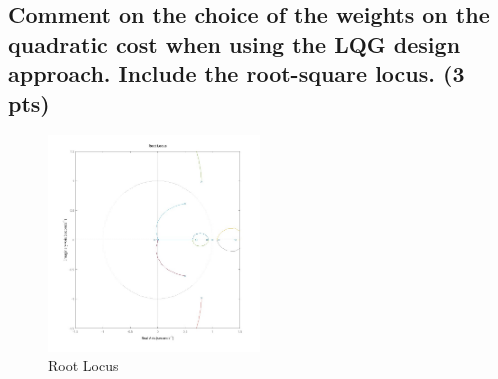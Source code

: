 \subsection{Comment on the choice of the weights on the quadratic cost when using the LQG design approach. Include the root-square locus. (3 pts)}
\vspace{10pt}


\begin{figure}[H]
    \centering
    \includegraphics[width=0.5\textwidth]{Figs/root_locus.jpg}
    \caption{Root Locus}
    \label{fig:controler_with_integrator}
\end{figure}